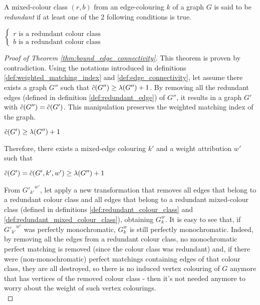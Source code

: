 \begin{definition}
    \label{def:redundant_mixed_colour_class}
    A mixed-colour class $(r, b)$ from an edge-colouring $k$ of a graph $G$ is said to be \textit{redundant} if at least one of the 2 following conditions is true.
    \begin{center}
        $\left\{
        \begin{array}{l}
            r \mbox{ is a redundant colour class} \\
            b \mbox{ is a redundant colour class}
        \end{array}
        \right.$
    \end{center}
\end{definition}

\begin{proof}[Proof of Theorem \ref{thm:bound_edge_connectivity}]
    This theorem is proven by contradiction. Using the notations introduced in definitions \ref{def:weighted_matching_index} and \ref{def:edge_connectivity}, let assume there exists a graph $G''$ such that $\Tilde{c}(G'') \geq \lambda(G'') + 1$. By removing all the redundant edges (defined in definition \ref{def:redundant_edge}) of $G''$, it results in a graph $G'$ with $\Tilde{c}(G'') = \Tilde{c}(G')$. This manipulation preserves the weighted matching index of the graph.
    
    \begin{center}
        $\Tilde{c}(G') \geq \lambda(G'') + 1$
    \end{center}
    
    Therefore, there exists a mixed-edge colouring $k'$ and a weight attribution $w'$ such that
    
    \begin{center}
        $\Tilde{c}(G') = \Tilde{c}(G', k', w') \geq \lambda(G'') + 1$
    \end{center}
    
    From ${G'_{k'}}^{w'}$, let apply a new transformation that removes all edges that belong to a redundant colour class and all edges that belong to a redundant mixed-colour class (defined in definitions \ref{def:redundant_colour_class} and \ref{def:redundant_mixed_colour_class}), obtaining $G_k^w$. It is easy to see that, if ${G'_{k'}}^{w'}$ was perfectly monochromatic, $G_k^w$ is still perfectly monochromatic. Indeed, by removing all the edges from a redundant colour class, no monochromatic perfect matching is removed (since the colour class was redundant) and, if there were (non-monochromatic) perfect matchings containing edges of that colour class, they are all destroyed, so there is no induced vertex colouring of $G$ anymore that has vertices of the removed colour class - then it's not needed anymore to worry about the weight of such vertex colourings. \\
    

\end{proof}
